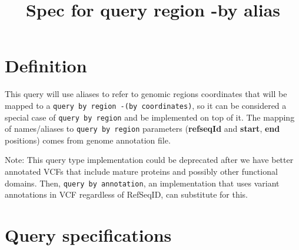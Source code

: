 \documentclass[a4paper, 10pt]{article}        %
\title{Spec for query region -by alias}     %
\begin{document}
\date{}
\maketitle

\section{Definition}


This query will use aliases to refer to genomic regions coordinates that will be mapped to a \texttt{query by region -(by coordinates)}, so it can be considered a special case of \texttt{query by region} and be implemented on top of it. The mapping of names/aliases to \texttt{query by region} parameters (\textbf{refseqId} and \textbf{start}, \textbf{end} positions) comes from genome annotation file. 


Note: This query type implementation could be deprecated after we have better annotated VCFs that include mature proteins and possibly other functional domains. Then, \texttt{query by annotation}, an implementation that uses variant annotations in VCF regardless of RefSeqID, can substitute for this.


\section{Query specifications}

\end{document}
